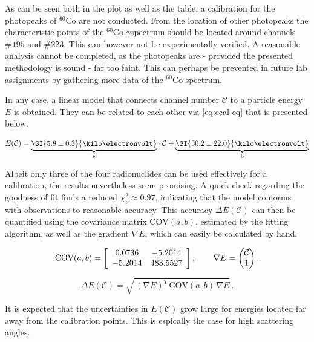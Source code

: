 

As can be seen both in the plot as well as the table, a calibration for the
photopeaks of $^{60}$Co are not conducted. From the location of other photopeaks the
characteristic points of the $^{60}$Co $\gamma$spectrum should be located around
channels $\#195$ and $\#223$. This can however not be experimentally verified. A
reasonable analysis cannot be completed, as the photopeaks are - provided the
presented methodology is sound - far too faint. This can perhaps be prevented in
future lab assignments by gathering more data of the $^{60}$Co spectrum.

In any case, a linear model that connects channel number $\mathcal{C}$ to a particle
energy $E$ is obtained. They can be related to each other via \autoref{eq:ecal-eq}
that is presented below.

\begin{equation}
\label{eq:ecal-eq}
	E(\mathcal{C}) = \underbrace{\SI{5.8\pm0.3}{\kilo\electronvolt}}_\text{a}\cdot\;\mathcal{C} + \underbrace{\SI{30.2\pm22.0}{\kilo\electronvolt}}_\text{b}
\end{equation}

Albeit only three of the four radionuclides can be used effectively for a
calibration, the results nevertheless seem promising. A quick check regarding the
goodness of fit finds a reduced $\chi^{2}_\nu\approx0.97$, indicating that the model
conforms with observations to reasonable accuracy. This accuracy $\Delta E
(\mathcal{C})$ can then be quantified using the covariance matrix $\text{COV}(a,b)$,
estimated by the fitting algorithm, as well as the gradient $\nabla E$, which can
easily be calculated by hand.

\begin{equation}
	\text{COV}(a,b) =
	\left[
	\begin{array}{c c}
	0.0736 & -5.2014 \\
	-5.2014 & 483.5527
	\end{array}
	\right],
	\qquad\nabla E = \begin{pmatrix}\mathcal{C}\\1\end{pmatrix}.
\end{equation}

\begin{equation}
\label{eq:energy-error}
	\Delta E(\mathcal{C}) = \sqrt{\,(\nabla E)^{T}\,\text{COV}(a,b)\,\nabla E}\,.
\end{equation}

It is expected that the uncertainties in $E(\mathcal{C})$ grow large for energies
located far away from the calibration points. This is espically the case for high
scattering angles.

